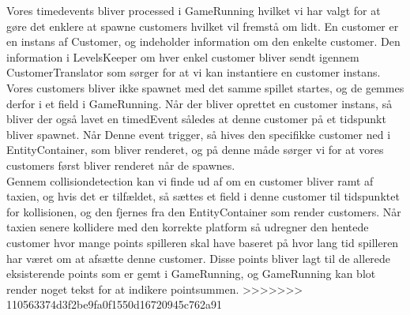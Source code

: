 Vores timedevents bliver processed i GameRunning hvilket vi har valgt for at gøre det enklere at spawne customers hvilket vil fremstå om lidt. En customer er en instans af Customer, og indeholder information om den enkelte customer. Den information i LevelsKeeper om hver enkel customer bliver sendt igennem CustomerTranslator som sørger for at vi kan instantiere en customer instans. Vores customers bliver ikke spawnet med det samme spillet startes, og de gemmes derfor i et field i GameRunning. Når der bliver oprettet en customer instans, så bliver der også lavet en timedEvent således at denne customer på et tidspunkt bliver spawnet. Når Denne event trigger, så hives den specifikke customer ned i EntityContainer, som bliver renderet, og på denne måde sørger vi for at vores customers først bliver renderet når de spawnes.\\
Gennem collisiondetection kan vi finde ud af om en customer bliver ramt af taxien, og hvis det er tilfældet, så sættes et field i denne customer til tidspunktet for kollisionen, og den fjernes fra den EntityContainer som render customers. Når taxien senere kollidere med den korrekte platform så udregner den hentede customer hvor mange points spilleren skal have baseret på hvor lang tid spilleren har været om at afsætte denne customer. Disse points bliver lagt til de allerede eksisterende points som er gemt i GameRunning, og GameRunning kan blot render noget tekst for at indikere pointsummen.
>>>>>>> 110563374d3f2be9fa0f1550d16720945c762a91
